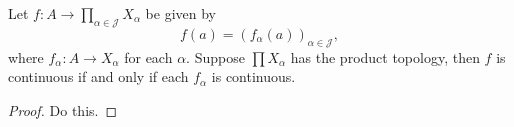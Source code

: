 \documentclass[10pt]{report}
\begin{document}
\begin{thrm}{}{}
	Let $f:A\to \prod_{\alpha\in\mathcal{J}}X_{\alpha}$ be given by \[f(a) = (f_{\alpha}(a))_{\alpha \in \mathcal{J}},\] where $f_{\alpha}:A\to X_{\alpha}$ for each $\alpha$. Suppose $\prod X_{\alpha}$ has the product topology, then $f$ is continuous if and only if each $f_{\alpha}$ is continuous.
\end{thrm}
\begin{proof}
{\color{red}Do this.}
\end{proof}
\end{document}
